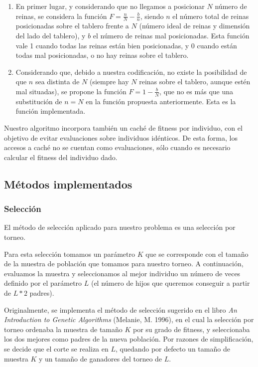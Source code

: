 \documentclass[12pt]{article}
\begin{document}
\begin{enumerate}
    \item En primer lugar, y considerando que no llegamos a posicionar $N$ número de reinas, se considera la función $F=\frac{n}{N} - \frac{b}{n}$, siendo $n$ el número total de reinas posicionadas sobre el tablero frente a $N$ (número ideal de reinas y dimensión del lado del tablero), y $b$ el número de reinas mal posicionadas. Esta función vale 1 cuando todas las reinas están bien posicionadas, y 0 cuando están todas mal posicionadas, o no hay reinas sobre el tablero.
    \item Considerando que, debido a nuestra codificación, no existe la posibilidad de que $n$ sea distinta de $N$ (siempre hay $N$ reinas sobre el tablero, aunque estén mal situadas), se propone la función $F=1-\frac{b}{N}$, que no es más que una substitución de $n=N$ en la función propuesta anteriormente. Esta es la función implementada.
\end{enumerate}

Nuestro algoritmo incorpora también un caché de fitness por individuo, con el objetivo de evitar evaluaciones sobre individuos idénticos. De esta forma, los accesos a caché no se cuentan como evaluaciones, sólo cuando es necesario calcular el fitness del individuo dado.

\subsection{Métodos implementados}

\subsubsection{Selección}

El método de selección aplicado para nuestro problema es una selección por torneo.

Para esta selección tomamos un parámetro $K$ que se corresponde con el tamaño de la muestra de población que tomamos para nuestro torneo. A continuación, evaluamos la muestra y seleccionamos al mejor individuo un número de veces definido por el parámetro $L$ (el número de hijos que queremos conseguir a partir de $L*2$ padres).

Originalmente, se implementa el método de selección sugerido en el libro \emph{An Introduction to Genetic Algorithms} (Melanie, M. 1996), en el cual la selección por torneo ordenaba la muestra de tamaño $K$ por su grado de fitness, y seleccionaba los dos mejores como padres de la nueva población. Por razones de simplificación, se decide que el corte se realiza en $L$, quedando por defecto un tamaño de muestra $K$ y un tamaño de ganadores del torneo de $L$.
\end{document}

